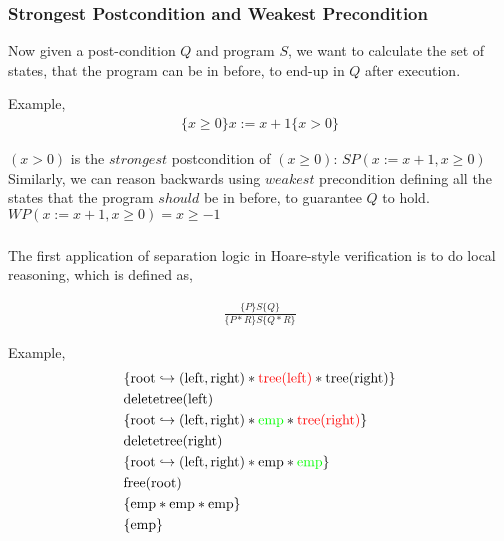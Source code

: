 \documentclass{beamer}
\begin{document}
\begin{frame}
\frametitle{Strongest Postcondition and Weakest Precondition}
Now given a post-condition $Q$ and program $S$, we want to calculate the set
of states, that the program can be in before, to end-up in $Q$ after execution.

Example,
\begin{align*}
    \{x \geq 0\}x := x + 1\{x > 0\}
\end{align*}

$(x > 0)$ is the $strongest$ postcondition of $(x \geq 0)$: $SP(x := x+1, x \geq 0)$\\[0.20cm]
Similarly, we can reason backwards using $weakest$ precondition defining all the states that the program $should$ be in before,
to guarantee $Q$ to hold. \\
$WP(x := x+1, x \geq 0) = x \geq -1$



\end{frame}

\begin{frame}
\frametitle{}
The first application of separation logic in Hoare-style verification is
to do local reasoning, which is defined as,

\begin{align*}
    \frac{\{P\} S \{Q\}}{\{P * R\} S \{Q * R\}}
\end{align*}

Example,
\begin{align*}
    & \{\textrm{root} \hookrightarrow (\textrm{left}, \textrm{right}) * \textcolor{red}{\textrm{tree(left)}} * \textrm{tree(right)}\} \\
    & \textrm{deletetree(left)} \\
    & \{\textrm{root} \hookrightarrow (\textrm{left}, \textrm{right}) * \textcolor{green}{\textrm{emp}} * \textcolor{red}{\textrm{tree(right)}}\} \\
    & \textrm{deletetree(right)} \\
    & \{\textrm{root} \hookrightarrow (\textrm{left}, \textrm{right}) * \textrm{emp} * \textcolor{green}{\textrm{emp}}\} \\
    & \textrm{free(root)} \\
    & \{\textrm{emp} * \textrm{emp} * \textrm{emp}\} \\
    & \{\textrm{emp}\}
\end{align*}
\end{frame}
\end{document}
